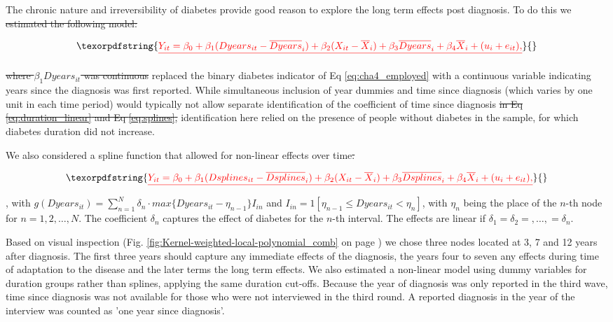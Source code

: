 \documentclass[12pt,english]{article}
\providecommand{\DIFaddtex}[1]{{\protect\color{blue}#1}} %
\providecommand{\DIFdeltex}[1]{{\protect\color{red}\sout{#1}}}                      %
\providecommand{\DIFaddbegin}{} %
\providecommand{\DIFaddend}{} %
\providecommand{\DIFdelbegin}{} %
\providecommand{\DIFdelend}{} %
\providecommand{\DIFadd}[1]{\texorpdfstring{\DIFaddtex{#1}}{#1}} %
\providecommand{\DIFdel}[1]{\texorpdfstring{\DIFdeltex{#1}}{}} %
\begin{document}
The chronic nature and irreversibility of diabetes provide good reason to explore the long term effects post diagnosis.  To do this we \DIFdelbegin \DIFdel{estimated the following model:
}%

\begin{displaymath}
\DIFdel{Y_{it}=\beta_{0}+\beta_{1}(Dyears_{it}-\overline{Dyears}_{i})+\beta_{2}(X_{it}-\overline{X}_i)+\beta_{3}\overline{Dyears}_{i}+\beta_{4}\overline{X}_i+(u_{i}+e_{it}),\label{eq:duration_linear}
}\end{displaymath}

\DIFdel{where $\beta_{1}Dyears_{it}$ was continuous }\DIFdelend \DIFaddbegin \DIFadd{replaced the binary diabetes indicator of Eq \ref{eq:cha4_employed} with a continuous variable }\DIFaddend indicating years since the diagnosis was first reported. While simultaneous inclusion of year dummies and time since diagnosis (which varies by one unit in each time period) would typically not allow separate identification of the coefficient of time since diagnosis \DIFdelbegin \DIFdel{in Eq \ref{eq:duration_linear} and Eq  \ref{eq:splines}, }\DIFdelend identification here relied on the presence of people without diabetes in the sample, for which diabetes duration did not increase.

We also considered a spline function that allowed for non-linear effects over time\DIFdelbegin \DIFdel{.
}%

\begin{displaymath}
\DIFdel{Y_{it}=\beta_{0}+\beta_{1}(Dsplines_{it}-\overline{Dsplines}_{i})+\beta_{2}(X_{it}-\overline{X}_i)+\beta_{3}\overline{Dsplines}_{i}+\beta_{4}\overline{X}_i+(u_{i}+e_{it}),%
}\end{displaymath}
\DIFdelend \DIFaddbegin \DIFadd{, with $g(Dyears_{it})=\sum_{n=1}^{N}\delta_{n}\cdot max\{Dyears_{it}-\eta_{n-1}\}I_{in}$
and $I_{in}=1[\eta_{n-1}\leq Dyears_{it}<\eta_{n}]$, with $\eta_{n}$ being the place of the $n$-th node for $n=1,2,\ldots,N$. The coefficient $\delta_{n}$ captures the effect of diabetes for the $n$-th interval. The effects are linear if $\delta_{1}=\delta_{2}=,\ldots,=\delta_{n}$.
}\DIFaddend 

Based on visual inspection (Fig. \ref{fig:Kernel-weighted-local-polynomial_comb} on page \pageref{fig:Kernel-weighted-local-polynomial_comb}) we chose three nodes located at 3, 7 and 12 years after diagnosis. The first three years should capture any immediate effects of the diagnosis, the years four to seven any effects during time of adaptation to the disease and the later terms the long term effects. We also estimated a non-linear model using dummy variables for duration groups rather than splines, applying the same duration cut-offs. Because the year of diagnosis was only reported in the third wave, time since diagnosis was not available for those who were not interviewed in the third round.  A reported diagnosis in the year of the interview was counted as 'one year since diagnosis'.
\end{document}
